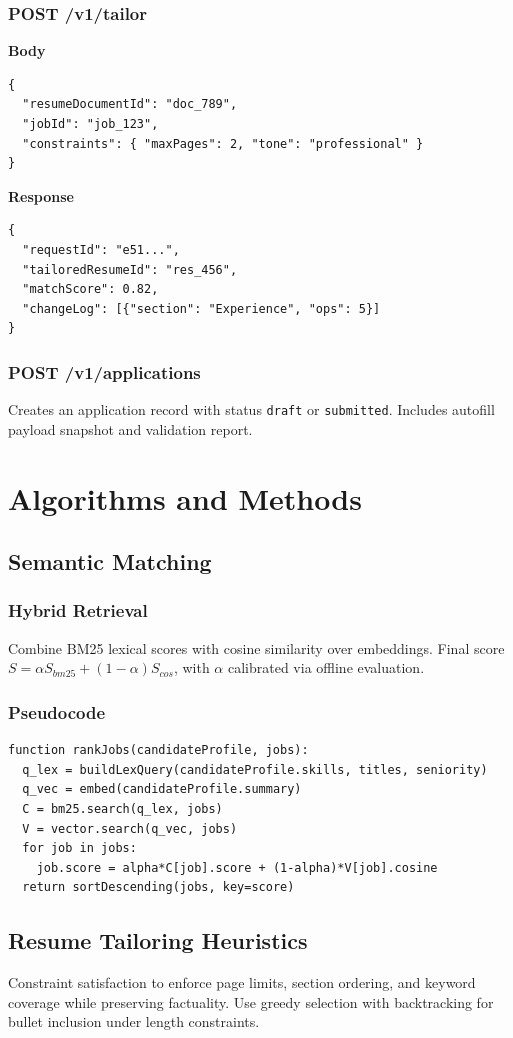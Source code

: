 \documentclass[12pt,a4paper]{article}
\begin{document}
\subsubsection{POST /v1/tailor}
\textbf{Body}
\begin{lstlisting}[style=code]
{
  "resumeDocumentId": "doc_789",
  "jobId": "job_123",
  "constraints": { "maxPages": 2, "tone": "professional" }
}
\end{lstlisting}
\textbf{Response}
\begin{lstlisting}[style=code]
{
  "requestId": "e51...",
  "tailoredResumeId": "res_456",
  "matchScore": 0.82,
  "changeLog": [{"section": "Experience", "ops": 5}]
}
\end{lstlisting}
\subsubsection{POST /v1/applications}
Creates an application record with status \texttt{draft} or \texttt{submitted}. Includes autofill payload snapshot and validation report.

\section{Algorithms and Methods}
\subsection{Semantic Matching}
\subsubsection{Hybrid Retrieval}
Combine BM25 lexical scores with cosine similarity over embeddings. Final score \(S = \alpha S_{bm25} + (1-\alpha) S_{cos}\), with \(\alpha\) calibrated via offline evaluation.
\subsubsection{Pseudocode}
\begin{lstlisting}[style=code]
function rankJobs(candidateProfile, jobs):
  q_lex = buildLexQuery(candidateProfile.skills, titles, seniority)
  q_vec = embed(candidateProfile.summary)
  C = bm25.search(q_lex, jobs)
  V = vector.search(q_vec, jobs)
  for job in jobs:
    job.score = alpha*C[job].score + (1-alpha)*V[job].cosine
  return sortDescending(jobs, key=score)
\end{lstlisting}
\subsection{Resume Tailoring Heuristics}
Constraint satisfaction to enforce page limits, section ordering, and keyword coverage while preserving factuality. Use greedy selection with backtracking for bullet inclusion under length constraints.
\end{document}
